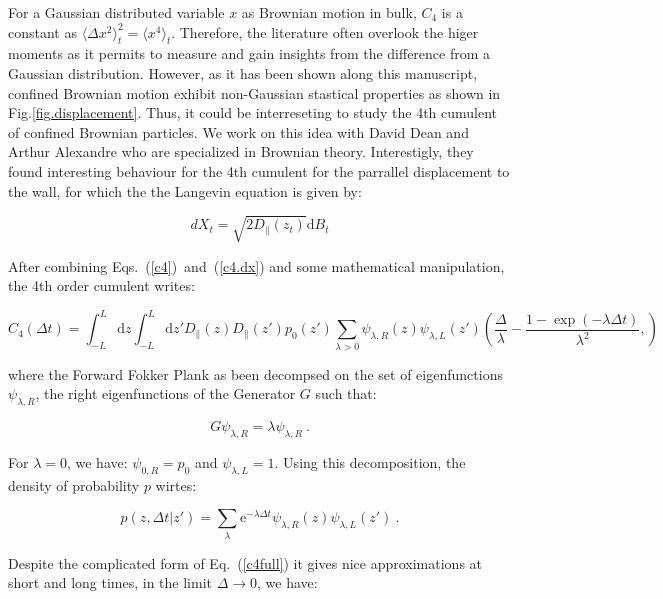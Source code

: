 For a Gaussian distributed variable $x$ as Brownian motion in bulk, $C_4$ is a constant as $\langle \Delta x ^2 \rangle _t ^2 = \langle x^4 \rangle_t $. Therefore, the literature often overlook the higer moments as it permits to measure and gain insights from the difference from a Gaussian distribution. However, as it has been shown along this manuscript, confined Brownian motion exhibit non-Gaussian stastical properties as shown in Fig.\ref{fig.displacement}. Thus, it could be interreseting to study the 4th cumulent of confined Brownian particles. We work on this idea with David Dean and Arthur Alexandre who are specialized in Brownian theory. Interestigly, they found interesting behaviour for the 4th cumulent for the parrallel displacement to the wall, for which the the Langevin equation is given by:

\begin{equation}
	dX_t = \sqrt{2D_\parallel(z_t)} \mathrm{d}B_t
	\label{c4.dx}
\end{equation}

After combining Eqs.~(\ref{c4})~and~(\ref{c4.dx}) and some mathematical manipulation, the 4th order cumulent writes:

\begin{equation}
	C_4(\Delta t) = \int_{-L} ^L \mathrm{d}z 
	\int ^L _{-L}\mathrm{d}z'
	D_\parallel(z) D_\parallel(z') p_0(z') 
	\sum_{\lambda > 0} \psi_{\lambda, R} (z) \psi_{\lambda, L}(z')
	\left(
	\frac{\Delta}{\lambda} - \frac{1 - \exp(-\lambda \Delta t)}{\lambda ^2},
	\right) 
	\label{c4full}
\end{equation}

where the Forward Fokker Plank as been decompsed on the set of eigenfunctions $\psi_{\lambda, R}$, the right eigenfunctions of the Generator $G$ such that:

\begin{equation}
	G\psi_{\lambda, R} = \lambda \psi_{\lambda, R} ~.
\end{equation}

For $\lambda = 0$, we have: $\psi_{0, R} = p_0$ and $\psi_{\lambda, L} = 1$. Using this decomposition, the density of probability $p$ wirtes:

\begin{equation}
	p(z, \Delta t|z') = \sum _\lambda \mathrm{e} ^{-\lambda \Delta t} \psi_{\lambda, R} (z) \psi_{\lambda, L} (z') ~.
\end{equation}

Despite the complicated form of Eq.~(\ref{c4full}) it gives nice approximations at short and long times, in the limit $\Delta \rightarrow 0$, we have:

